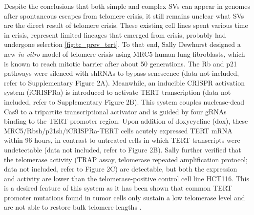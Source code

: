 \documentclass[phd,tocprelim]{cornell}
\renewcommand{\caption}[1]{\singlespacing\hangcaption{#1}\normalspacing}
\begin{document}


Despite the conclusions that both simple and complex SVs can appear in genomes after spontaneous escapes from telomere crisis, it still remains unclear what SVs are the direct result of telomere crisis. These existing cell lines spent various time in crisis, represent limited lineages that emerged from crisis, probably had undergone selection \ref{fig:tc_prev_tert}. To that end, Sally Dewhurst designed a new \textit{in vitro} model of telomere crisis using MRC5 human lung fibroblasts, which is known to reach mitotic barrier after about 50 generations. The Rb and p21 pathways were silenced with shRNAs to bypass senescence (data not included, refer to \cite{Dewhurst2021-jk} Supplementary Figure 2A). Meanwhile, an inducible CRISPR activation system (iCRISPRa) is introduced to activate TERT transcription (data not included, refer to \cite{Dewhurst2021-jk} Supplementary Figure 2B). This system couples nuclease-dead Cas9 to a tripartite transcriptional activator and is guided by four gRNAs binding to the TERT promoter region. Upon addition of doxycycline (dox), these MRC5/Rbsh/p21sh/iCRISPRa-TERT cells acutely expressed TERT mRNA within 96 hours, in contrast to untreated cells in which TERT transcripts were undetectable (data not included, refer to \cite{Dewhurst2021-jk} Figure 2B). Sally further verified that the telomerase activity (TRAP assay, telomerase repeated amplification protocol; data not included, refer to \cite{Dewhurst2021-jk} Figure 2C) are detectable, but both the expression and activity are lower than the telomerase-positive control cell line HCT116. This is a desired feature of this system as it has been shown that common TERT promoter mutations found in tumor cells only sustain a low telomerase level and are not able to restore bulk telomere lengths \cite{Chiba2017-gq}.
\end{document}
